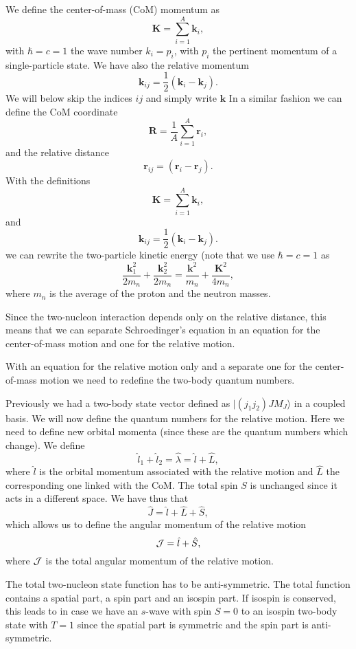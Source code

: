 \documentclass[graybox,sectrefs,envcountresetchap,open=right]{svmonodo}
\begin{document}
\noindent
We define the center-of-mass (CoM)  momentum as
 \[
    \mathbf{K}=\sum_{i=1}^A\mathbf{k}_i,
 \]
with $\hbar=c=1$ the wave number $k_i=p_i$, with $p_i$ the pertinent momentum of a single-particle state. 
We have also the relative momentum
\[
    \mathbf{k}_{ij}=\frac{1}{2}(\mathbf{k}_i-\mathbf{k}_j).
 \]
We will below skip the indices $ij$ and simply write $\mathbf{k}$
In a similar fashion we can define the CoM coordinate
 \[
     \mathbf{R}=\frac{1}{A}\sum_{i=1}^{A}\mathbf{r}_i,
 \]
 and the relative distance 
\[
    \mathbf{r}_{ij}=(\mathbf{r}_i-\mathbf{r}_j).
 \]
With the definitions
 \[
    \mathbf{K}=\sum_{i=1}^A\mathbf{k}_i,
 \]
and
\[
    \mathbf{k}_{ij}=\frac{1}{2}(\mathbf{k}_i-\mathbf{k}_j).
 \]
we can rewrite the two-particle kinetic energy (note that we use $\hbar=c=1$ as 
\[
\frac{\mathbf{k}_1^2}{2m_n}+\frac{\mathbf{k}_2^2}{2m_n}=\frac{\mathbf{k}^2}{m_n}+\frac{\mathbf{K}^2}{4m_n},
\]
where $m_n$ is the average of the proton and the neutron masses. 

\noindent
Since the two-nucleon interaction depends only on the relative distance, this means that we can separate Schroedinger's equation in an equation for the center-of-mass motion and one for the relative motion.

\noindent
With an equation for the relative motion only and a separate one for the center-of-mass motion we need to redefine the two-body quantum numbers.

\noindent
Previously we had a two-body state vector defined as $|(j_1j_2)JM_J\rangle$ in a coupled basis. 
We will now define the quantum numbers for the relative motion. Here we need to define new orbital momenta (since these are the quantum numbers which change). 
We define 
\[
\hat{l}_1+\hat{l}_2=\hat{\lambda}=\hat{l}+\hat{L},
\]
where $\hat{l}$ is the orbital momentum associated with the relative motion and
$\hat{L}$ the corresponding one linked with the CoM. The total spin $S$ is unchanged since it acts in a different space. We have thus that
\[
\hat{J}=\hat{l}+\hat{L}+\hat{S},
\]
which allows us to define the angular momentum of the relative motion
\[
{ \cal J} =  \hat{l}+\hat{S},
\]
where ${ \cal J}$ is the total angular momentum of the relative motion.


The total two-nucleon state function has to be anti-symmetric. The total function contains a spatial part, a spin part and an isospin part. If isospin is conserved, this leads to in case we have an $s$-wave with spin $S=0$ to an isospin 
two-body state with $T=1$ since the spatial part is symmetric and the spin part is anti-symmetric. 
\end{document}
